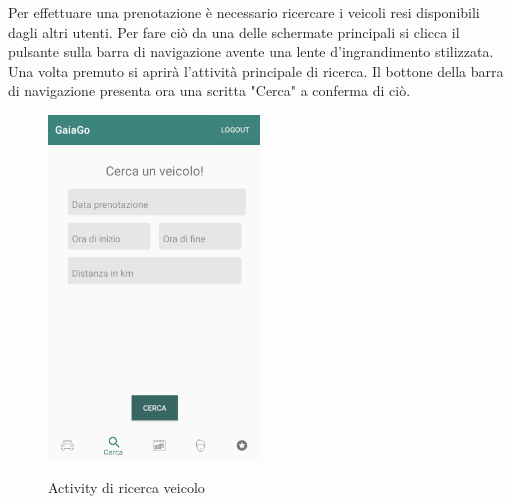 Per effettuare una prenotazione è necessario ricercare i veicoli resi disponibili dagli altri utenti. Per fare ciò da una delle schermate principali si clicca il pulsante sulla barra di navigazione avente una lente d'ingrandimento stilizzata. Una volta premuto si aprirà l'attività principale di ricerca. Il bottone della barra di navigazione presenta ora una scritta "Cerca" a conferma di ciò.
  \begin{figure}[H] 
 	\centering 
 	\includegraphics[width=0.5\textwidth]{res/images/cerca_veicolo.png}\\
 	\caption{Activity di ricerca veicolo}
 	\label{ricerca}
 \end{figure}
\pagebreak


